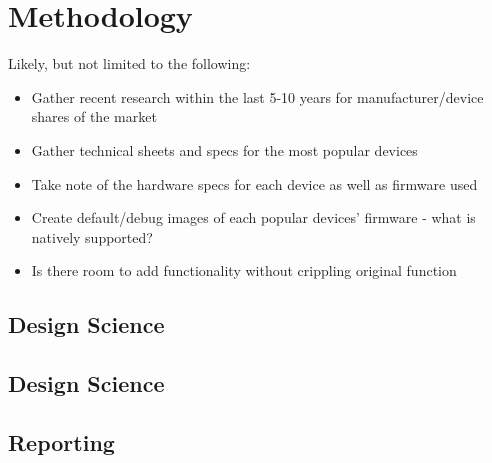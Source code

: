 \section{Methodology}
Likely, but not limited to the following:
\begin{itemize}
  \item Gather recent research within the last 5-10 years for manufacturer/device shares of the market
  \item Gather technical sheets and specs for the most popular devices
  \item Take note of the hardware specs for each device as well as firmware used
  \item Create default/debug images of each popular devices' firmware - what is natively supported?
  \item Is there room to add functionality without crippling original function
\end{itemize}


\subsection{Design Science}



\subsection{Design Science}



\subsection{Reporting}


